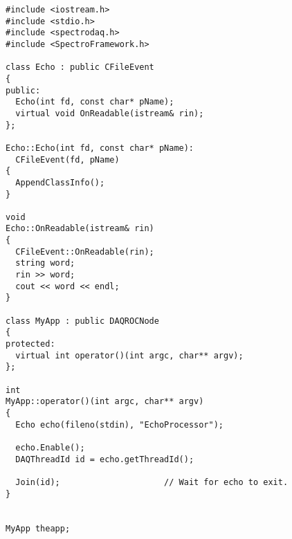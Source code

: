 \footnotesize\begin{verbatim}#include <iostream.h>
#include <stdio.h>
#include <spectrodaq.h>
#include <SpectroFramework.h>

class Echo : public CFileEvent
{
public:
  Echo(int fd, const char* pName);
  virtual void OnReadable(istream& rin);
};

Echo::Echo(int fd, const char* pName):
  CFileEvent(fd, pName)
{
  AppendClassInfo();
}

void
Echo::OnReadable(istream& rin)
{
  CFileEvent::OnReadable(rin);
  string word;
  rin >> word;
  cout << word << endl;
}

class MyApp : public DAQROCNode
{
protected:
  virtual int operator()(int argc, char** argv);
};

int
MyApp::operator()(int argc, char** argv)
{
  Echo echo(fileno(stdin), "EchoProcessor");

  echo.Enable();
  DAQThreadId id = echo.getThreadId();

  Join(id);                     // Wait for echo to exit.
}


MyApp theapp;
\end{verbatim}\normalsize 


